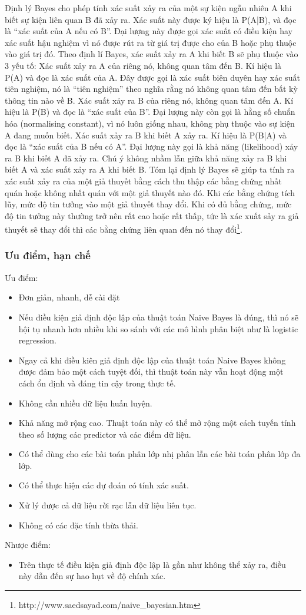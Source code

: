 Định lý Bayes cho phép tính xác suất xảy ra của một sự kiện ngẫu nhiên A khi biết sự kiện liên quan B đã xảy ra. Xác suất này được ký hiệu là P(A|B), và đọc là “xác suất của A nếu có B”. Đại lượng này được gọi xác suất có điều kiện hay xác suất hậu nghiệm vì nó được rút ra từ giá trị được cho của B hoặc phụ thuộc vào giá trị đó. Theo định lí Bayes, xác suất xảy ra A khi biết B sẽ phụ thuộc vào 3 yếu tố: Xác suất xảy ra A của riêng nó, không quan tâm đến B. Kí hiệu là P(A) và đọc là xác suất của A. Đây được gọi là xác suất biên duyên hay xác suất tiên nghiệm, nó là “tiên nghiệm” theo nghĩa rằng nó không quan tâm đến bất kỳ thông tin nào về B. Xác suất xảy ra B của riêng nó, không quan tâm đến A. Kí hiệu là P(B) và đọc là “xác suất của B”. Đại lượng này còn gọi là hằng số chuẩn hóa (normalising constant), vì nó luôn giống nhau, không phụ thuộc vào sự kiện A đang muốn biết. Xác suất xảy ra B khi biết A xảy ra. Kí hiệu là P(B|A) và đọc là “xác suất của B nếu có A”. Đại lượng này gọi là khả năng (likelihood) xảy ra B khi biết A đã xảy ra. Chú ý không nhầm lẫn giữa khả năng xảy ra B khi biết A và xác suất xảy ra A khi biết B. Tóm lại định lý Bayes sẽ giúp ta tính ra xác suất xảy ra của một giả thuyết bằng cách thu thập các bằng chứng nhất quán hoặc không nhất quán với một giả thuyết nào đó. Khi các bằng chứng tích lũy, mức độ tin tưởng vào một giả thuyết thay đổi. Khi có đủ bằng chứng, mức độ tin tưởng này thường trở nên rất cao hoặc rất thấp, tức là xác xuất sảy ra giả thuyết sẽ thay đổi thì các bằng chứng liên quan đến nó thay đổi\footnote{http://www.saedsayad.com/naive_bayesian.htm}.
\subsubsection{Ưu điểm, hạn chế}
Ưu điểm:
\begin{itemize}
  \item Đơn giản, nhanh, dễ cài đặt
  \item Nếu điều kiện giả định độc lập của thuật toán Naive Bayes là đúng, thì nó sẽ hội tụ nhanh hơn nhiều khi so sánh với các mô hình phân biệt như là logistic regression.
  \item Ngay cả khi điều kiên giả định độc lập của thuật toán Naive Bayes không được đảm bảo một cách tuyệt đối, thì thuật toán này vẫn hoạt động một cách ổn định và đáng tin cậy trong thực tế. 
  \item Không cần nhiều dữ liệu huấn luyện.
  \item Khả năng mở rộng cao. Thuật toán này có thể mở rộng một cách tuyến tính theo số lượng các predictor và các điểm dữ liệu.
  \item Có thể dùng cho các bài toán phân lớp nhị phân lẫn các bài toán phân lớp đa lớp.
  \item Có thể thực hiện các dự đoán có tính xác suất.
  \item Xử lý được cả dữ liệu rời rạc lẫn dữ liệu liên tục.
  \item Không có các đặc tính thừa thải.
\end{itemize}
Nhược điểm:
\begin{itemize}
  \item Trên thực tế điều kiện giả định độc lập là gần như không thể xảy ra, điều này dẫn đến sự hao hụt về độ chính xác.
\end{itemize}
